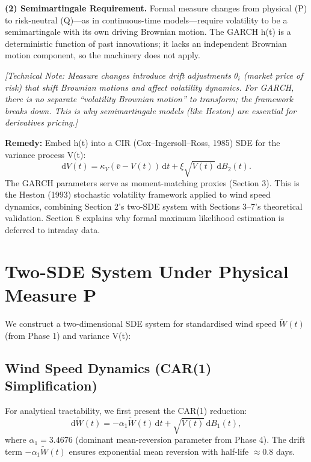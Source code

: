 \documentclass[11pt, a4paper, twoside]{article}
\begin{document}
\textbf{(2) Semimartingale Requirement.} Formal measure changes from physical (P) to risk-neutral (Q)---as in continuous-time models---require volatility to be a semimartingale with its own driving Brownian motion. The GARCH h(t) is a deterministic function of past innovations; it lacks an independent Brownian motion component, so the machinery does not apply.

\textit{[Technical Note: Measure changes introduce drift adjustments $\theta_i$ (market price of risk) that shift Brownian motions and affect volatility dynamics. For GARCH, there is no separate ``volatility Brownian motion'' to transform; the framework breaks down. This is why semimartingale models (like Heston) are essential for derivatives pricing.]}

\textbf{Remedy:} Embed h(t) into a CIR (Cox--Ingersoll--Ross, 1985) SDE for the variance process V(t):
\begin{equation}
\mathrm{d}V(t) = \kappa_V (\bar{v} - V(t)) \, \mathrm{d}t + \xi \sqrt{V(t)} \, \mathrm{d}B_2(t).
\end{equation}
The GARCH parameters serve as moment-matching proxies (Section 3). This is the Heston (1993) stochastic volatility framework applied to wind speed dynamics, combining Section 2's two-SDE system with Sections 3--7's theoretical validation. Section 8 explains why formal maximum likelihood estimation is deferred to intraday data.

\section{Two-SDE System Under Physical Measure P}

We construct a two-dimensional SDE system for standardised wind speed $\tilde{W}(t)$ (from Phase 1) and variance V(t):

\subsection{Wind Speed Dynamics (CAR(1) Simplification)}

For analytical tractability, we first present the CAR(1) reduction:
\begin{equation}
\mathrm{d}\tilde{W}(t) = -\alpha_1 \tilde{W}(t) \, \mathrm{d}t + \sqrt{V(t)} \, \mathrm{d}B_1(t),
\end{equation}
where $\alpha_1 = 3.4676$ (dominant mean-reversion parameter from Phase 4). The drift term $-\alpha_1 \tilde{W}(t)$ ensures exponential mean reversion with half-life $\approx 0.8$ days.
\end{document}
